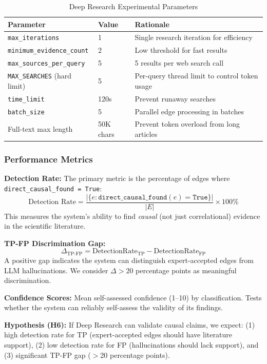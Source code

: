 \begin{table}[H]
\centering
\caption{Deep Research Experimental Parameters}
\label{tab:dr_params}
\footnotesize
\begin{tabular}{@{}l l l@{}}
\toprule
\textbf{Parameter} & \textbf{Value} & \textbf{Rationale} \\
\midrule
\texttt{max\_iterations} & 1 & Single research iteration for efficiency \\
\texttt{minimum\_evidence\_count} & 2 & Low threshold for fast results \\
\texttt{max\_sources\_per\_query} & 5 & 5 results per web search call \\
\texttt{MAX\_SEARCHES} (hard limit) & 5 & Per-query thread limit to control token usage \\
\texttt{time\_limit} & 120s & Prevent runaway searches \\
\texttt{batch\_size} & 5 & Parallel edge processing in batches \\
Full-text max length & 50K chars & Prevent token overload from long articles \\
\bottomrule
\end{tabular}
\end{table}

\subsubsection{Performance Metrics}

\textbf{Detection Rate:} The primary metric is the percentage of edges where \texttt{direct\_causal\_found = True}:
\[
\text{Detection Rate} = \frac{|\{e : \texttt{direct\_causal\_found}(e) = \texttt{True}\}|}{|E|} \times 100\%
\]
This measures the system's ability to find \textit{causal} (not just correlational) evidence in the scientific literature.

\textbf{TP-FP Discrimination Gap:}
\[
\Delta_{\text{TP-FP}} = \text{DetectionRate}_{\text{TP}} - \text{DetectionRate}_{\text{FP}}
\]
A positive gap indicates the system can distinguish expert-accepted edges from LLM hallucinations. We consider $\Delta > 20$ percentage points as meaningful discrimination.

\textbf{Confidence Scores:} Mean self-assessed confidence (1--10) by classification. Tests whether the system can reliably self-assess the validity of its findings.

\textbf{Hypothesis (H6):} If Deep Research can validate causal claims, we expect: (1) high detection rate for TP (expert-accepted edges should have literature support), (2) low detection rate for FP (hallucinations should lack support), and (3) significant TP-FP gap ($>$20 percentage points).

